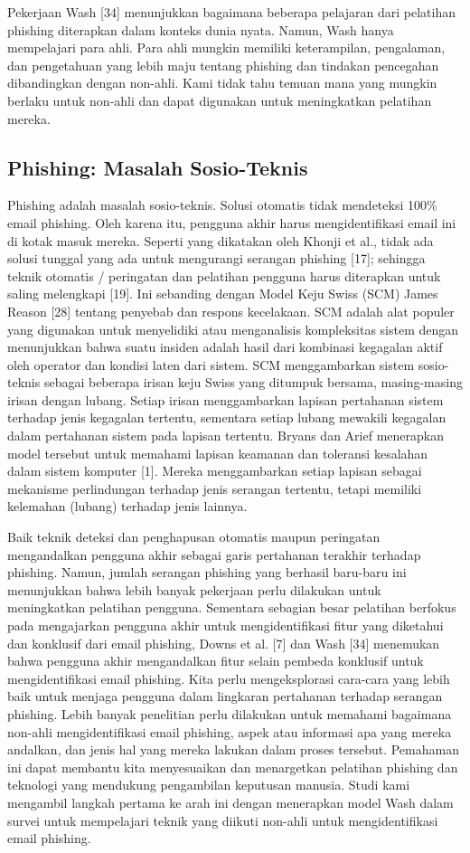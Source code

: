 \documentclass[lettersize,journal]{IEEEtran}
\begin{document}
Pekerjaan Wash [34] menunjukkan bagaimana beberapa pelajaran dari pelatihan phishing diterapkan dalam konteks dunia nyata. Namun, Wash hanya mempelajari para ahli. Para ahli mungkin memiliki keterampilan, pengalaman, dan pengetahuan yang lebih maju tentang phishing dan tindakan pencegahan dibandingkan dengan non-ahli. Kami tidak tahu temuan mana yang mungkin berlaku untuk non-ahli dan dapat digunakan untuk meningkatkan pelatihan mereka.

\subsection{Phishing: Masalah Sosio-Teknis}

Phishing adalah masalah sosio-teknis. Solusi otomatis tidak mendeteksi 100\% email phishing. Oleh karena itu, pengguna akhir harus mengidentifikasi email ini di kotak masuk mereka. Seperti yang dikatakan oleh Khonji et al., tidak ada solusi tunggal yang ada untuk mengurangi serangan phishing [17]; sehingga teknik otomatis / peringatan dan pelatihan pengguna harus diterapkan untuk saling melengkapi [19]. Ini sebanding dengan Model Keju Swiss (SCM) James Reason [28] tentang penyebab dan respons kecelakaan. SCM adalah alat populer yang digunakan untuk menyelidiki atau menganalisis kompleksitas sistem dengan menunjukkan bahwa suatu insiden adalah hasil dari kombinasi kegagalan aktif oleh operator dan kondisi laten dari sistem. SCM menggambarkan sistem sosio-teknis sebagai beberapa irisan keju Swiss yang ditumpuk bersama, masing-masing irisan dengan lubang. Setiap irisan menggambarkan lapisan pertahanan sistem terhadap jenis kegagalan tertentu, sementara setiap lubang mewakili kegagalan dalam pertahanan sistem pada lapisan tertentu. Bryans dan Arief menerapkan model tersebut untuk memahami lapisan keamanan dan toleransi kesalahan dalam sistem komputer [1]. Mereka menggambarkan setiap lapisan sebagai mekanisme perlindungan terhadap jenis serangan tertentu, tetapi memiliki kelemahan (lubang) terhadap jenis lainnya.

Baik teknik deteksi dan penghapusan otomatis maupun peringatan mengandalkan pengguna akhir sebagai garis pertahanan terakhir terhadap phishing. Namun, jumlah serangan phishing yang berhasil baru-baru ini menunjukkan bahwa lebih banyak pekerjaan perlu dilakukan untuk meningkatkan pelatihan pengguna. Sementara sebagian besar pelatihan berfokus pada mengajarkan pengguna akhir untuk mengidentifikasi fitur yang diketahui dan konklusif dari email phishing, Downs et al. [7] dan Wash [34] menemukan bahwa pengguna akhir mengandalkan fitur selain pembeda konklusif untuk mengidentifikasi email phishing. Kita perlu mengeksplorasi cara-cara yang lebih baik untuk menjaga pengguna dalam lingkaran pertahanan terhadap serangan phishing. Lebih banyak penelitian perlu dilakukan untuk memahami bagaimana non-ahli mengidentifikasi email phishing, aspek atau informasi apa yang mereka andalkan, dan jenis hal yang mereka lakukan dalam proses tersebut. Pemahaman ini dapat membantu kita menyesuaikan dan menargetkan pelatihan phishing dan teknologi yang mendukung pengambilan keputusan manusia. Studi kami mengambil langkah pertama ke arah ini dengan menerapkan model Wash dalam survei untuk mempelajari teknik yang diikuti non-ahli untuk mengidentifikasi email phishing.
\end{document}
